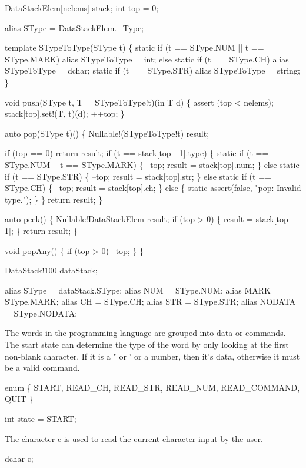   DataStackElem[nelems] stack;
  int top = 0;

  alias SType = DataStackElem._Type;

  template STypeToType(SType t) \{
    static if (t == SType.NUM || t == SType.MARK)
      alias STypeToType = int;
    else static if (t == SType.CH)
      alias STypeToType = dchar;
    static if (t == SType.STR)
      alias STypeToType = string;
  \}

  void push(SType t, T = STypeToType!t)(in T d)
  \{
    assert (top < nelems);
    stack[top].set!(T, t)(d);
    ++top;
  \}

  auto pop(SType t)()
  \{
    Nullable!(STypeToType!t) result;

    if (top == 0) return result;
    if (t == stack[top - 1].type) \{
      static if (t == SType.NUM ||
                 t == SType.MARK) \{
        --top;
        result = stack[top].num;
      \} else static if (t == SType.STR) \{
        --top;
        result = stack[top].str;
      \} else static if (t == SType.CH) \{
        --top;
        result = stack[top].ch;
      \} else \{
        static assert(false, "pop: Invalid type.");
      \}
    \}
    return result;
  \}

  auto peek()
  \{
    Nullable!DataStackElem result;
    if (top > 0) \{
      result = stack[top - 1];
    \}
    return result;
  \}

  void popAny()
  \{
    if (top > 0) --top;
  \}
\}

DataStack!100 dataStack;

alias SType  = dataStack.SType;
alias NUM    = SType.NUM;
alias MARK   = SType.MARK;
alias CH     = SType.CH;
alias STR    = SType.STR;
alias NODATA = SType.NODATA;

\nwendcode{}The words in the programming language are grouped into data or
commands. The start state can determine the type of the word by only
looking at the first non-blank character. If it is a " or ' or a
number, then it's data, otherwise it must be a valid command.

\nwenddocs{}\endmoddef\nwstartdeflinemarkup\nwenddeflinemarkup
enum \{
  START,
  READ_CH,
  READ_STR,
  READ_NUM,
  READ_COMMAND,
  QUIT
\}

int state = START;

\nwendcode{}The character {\Tt{}c\nwendquote} is used to read the current character input by
the user.

\nwenddocs{}\endmoddef\nwstartdeflinemarkup\nwenddeflinemarkup
dchar c;

